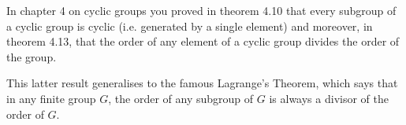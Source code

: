 \documentclass[oneside,10pt]{amsart}
\begin{document}


In chapter 4 on cyclic groups you proved in theorem 4.10 that every subgroup of a cyclic group is cyclic (i.e. generated by a single element) and moreover, in theorem 4.13, that the order of any element of a cyclic group divides the order of the group.

This latter result generalises to the famous Lagrange's Theorem, which says that in any finite group $G$, the order of any subgroup of $G$ is always a divisor of the order of $G$. 
\end{document}
